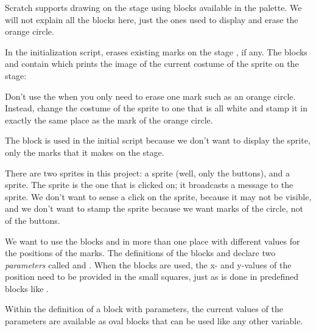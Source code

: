 Scratch supports drawing on the stage using blocks available in the
 palette. We will not explain all the blocks here, just the ones
used to display and erase the orange circle.

In the initialization script,  erases existing marks on
the stage , if any. The blocks  and
 contain  which prints the image of
the current costume of the sprite on the stage:



Don't use the  when you only need to erase one mark such
as an orange circle. Instead, change the costume of the sprite to one
that is all white and stamp it in exactly the same place as the mark of
the orange circle.

The block  is used in the initial script because we don't
want to display the sprite, only the marks that it makes on the stage.


There are two sprites in this project: a  sprite (well, only
the buttons), and a  sprite. The 
sprite is the one that is clicked on; it broadcasts a message to the
 sprite. We don't want to sense a click on the 
sprite, because it may not be visible, and we don't want to stamp the
 sprite because we want marks of the circle, not of the
buttons.


We want to use the blocks  and
 in more than one place with different values for
the positions of the marks. The definitions of the blocks
 and  declare two
\emph{parameters} called  and . When the blocks are used, the
x- and y-values of the position need to be provided in the small
squares, just as is done in predefined blocks like .

Within the definition of a block with parameters, the current values of
the parameters are available as oval blocks that can be used like any
other variable.
